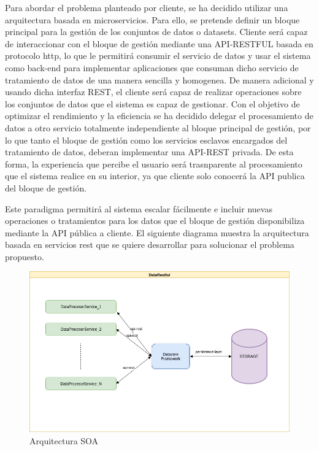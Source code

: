 \documentclass[a4paper,11pt]{book}
\begin{document}
Para abordar el problema planteado por cliente, se ha decidido utilizar una arquitectura basada en microservicios. Para ello, se pretende definir un bloque principal para la gestión de los conjuntos de datos o datasets. Cliente será capaz de interaccionar con el bloque de gestión mediante una API-RESTFUL basada en protocolo http, lo que le permitirá consumir el servicio de datos y usar el sistema como back-end para implementar aplicaciones que consuman dicho servicio de tratamiento de datos de una manera sencilla y homogenea. De manera adicional y usando dicha interfaz REST, el cliente será capaz de realizar operaciones sobre los conjuntos de datos que  el sistema es capaz de gestionar. Con el objetivo de optimizar el rendimiento y la eficiencia se ha decidido delegar el procesamiento de datos a otro servicio totalmente independiente al bloque principal de gestión, por lo que tanto el bloque de gestión como los servicios esclavos encargados del tratamiento de datos, deberan implementar una API-REST privada. De esta forma, la experiencia que percibe el usuario será trasnparente al procesamiento que el sistema realice en su interior, ya que cliente solo conocerá la API publica del bloque de gestión. 

Este paradigma permitirá al sistema escalar fácilmente e incluir nuevas operaciones o tratamientos para los datos que el bloque de gestión disponibiliza mediante la API pública a cliente. El siguiente diagrama muestra la arquitectura basada en servicios rest que se quiere desarrollar para solucionar el problema propuesto. 


\begin{figure}[H]  
\centering 
\includegraphics[scale=0.35]{imagenes/arquitectura_datarest.png}
\caption{ Arquitectura SOA }  
\end{figure} 
\end{document}

